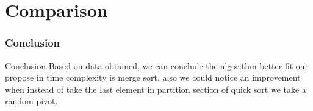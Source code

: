 \documentclass{beamer}
\begin{document}
\section{Comparison}
\begin{frame}
\frametitle{Conclusion}
\begin{block}{Conclusion}
Based on data obtained, we can conclude the algorithm better fit our propose in time complexity is merge sort, also we could notice an improvement when instead of take the last element in partition section of quick sort we take a random pivot. 
\end{block}
\end{frame}
\end{document}
